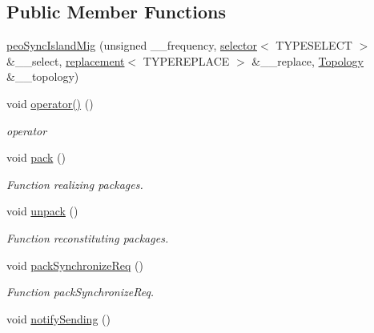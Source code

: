 \subsection*{Public Member Functions}
\begin{CompactItemize}
\item 
\hyperlink{classpeoSyncIslandMig_24f4d1ea8bb63c09b9d6cd8476014082}{peo\-Sync\-Island\-Mig} (unsigned \_\-\_\-frequency, \hyperlink{classselector}{selector}$<$ TYPESELECT $>$ \&\_\-\_\-select, \hyperlink{classreplacement}{replacement}$<$ TYPEREPLACE $>$ \&\_\-\_\-replace, \hyperlink{classTopology}{Topology} \&\_\-\_\-topology)
\item 
\hypertarget{classpeoSyncIslandMig_0fd5b3b4e467ee33ae0186c0ae9d58ef}{
void \hyperlink{classpeoSyncIslandMig_0fd5b3b4e467ee33ae0186c0ae9d58ef}{operator()} ()}
\label{classpeoSyncIslandMig_0fd5b3b4e467ee33ae0186c0ae9d58ef}

\begin{CompactList}\small\item\em operator \item\end{CompactList}\item 
\hypertarget{classpeoSyncIslandMig_2daadf9928b8075ea469ca3cc49ddc88}{
void \hyperlink{classpeoSyncIslandMig_2daadf9928b8075ea469ca3cc49ddc88}{pack} ()}
\label{classpeoSyncIslandMig_2daadf9928b8075ea469ca3cc49ddc88}

\begin{CompactList}\small\item\em Function realizing packages. \item\end{CompactList}\item 
\hypertarget{classpeoSyncIslandMig_25bc1a03cc49e17dda34b6647df1f9c5}{
void \hyperlink{classpeoSyncIslandMig_25bc1a03cc49e17dda34b6647df1f9c5}{unpack} ()}
\label{classpeoSyncIslandMig_25bc1a03cc49e17dda34b6647df1f9c5}

\begin{CompactList}\small\item\em Function reconstituting packages. \item\end{CompactList}\item 
\hypertarget{classpeoSyncIslandMig_956f56110bccff8c8fae4b05aa804d32}{
void \hyperlink{classpeoSyncIslandMig_956f56110bccff8c8fae4b05aa804d32}{pack\-Synchronize\-Req} ()}
\label{classpeoSyncIslandMig_956f56110bccff8c8fae4b05aa804d32}

\begin{CompactList}\small\item\em Function pack\-Synchronize\-Req. \item\end{CompactList}\item 
\hypertarget{classpeoSyncIslandMig_5f403428cea887b07caf27ab265ebe03}{
void \hyperlink{classpeoSyncIslandMig_5f403428cea887b07caf27ab265ebe03}{notify\-Sending} ()}
\label{classpeoSyncIslandMig_5f403428cea887b07caf27ab265ebe03}


\end{CompactItemize}
